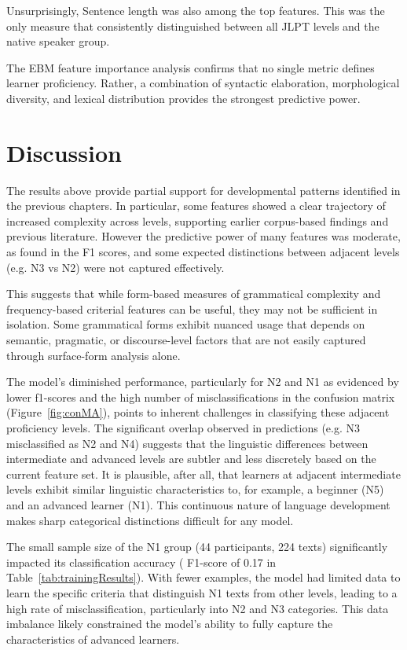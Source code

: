 Unsurprisingly, Sentence length was also among the top features. This was the only measure that consistently
distinguished between all JLPT levels and the native speaker group.

The EBM feature importance analysis confirms that no single metric defines learner proficiency. Rather, a
combination of syntactic elaboration, morphological diversity, and lexical distribution provides the strongest
predictive power.

\section{Discussion}

The results above provide partial support for developmental patterns identified in the previous chapters. In
particular, some features showed a clear trajectory of increased complexity across levels, supporting
earlier corpus-based findings and previous literature. However the predictive power of many features was moderate,
as found in the F1 scores, and some expected distinctions between adjacent levels (e.g. N3 vs N2) were not captured
effectively.

This suggests that while form-based measures of grammatical complexity and frequency-based criterial features can be
useful, they may not be sufficient in isolation. Some grammatical forms exhibit nuanced usage that depends on
semantic, pragmatic, or discourse-level factors that are not easily captured through surface-form
analysis alone.

The model's diminished performance, particularly for N2 and N1 as evidenced by lower f1-scores and the high number
of misclassifications in the confusion matrix (Figure~\ref{fig:conMA}), points to inherent challenges in
classifying these adjacent proficiency levels. The significant overlap observed in predictions (e.g. N3 misclassified
as N2 and N4) suggests that the linguistic differences between intermediate and advanced levels are subtler and less
discretely based on the current feature set. It is plausible, after all, that learners at adjacent intermediate
levels exhibit similar linguistic characteristics to, for example, a beginner (N5) and an advanced learner (N1).
This continuous nature of language development makes sharp categorical distinctions difficult for any model.

The small sample size of the N1 group (44 participants, 224 texts) significantly impacted its classification accuracy (
F1-score
of 0.17 in Table~\ref{tab:trainingResults}). With fewer examples, the model had limited data to learn the specific
criteria that distinguish N1 texts from other levels, leading to a high rate of misclassification, particularly into
N2 and N3 categories. This data imbalance likely constrained the model's ability to fully capture the
characteristics of advanced learners.


